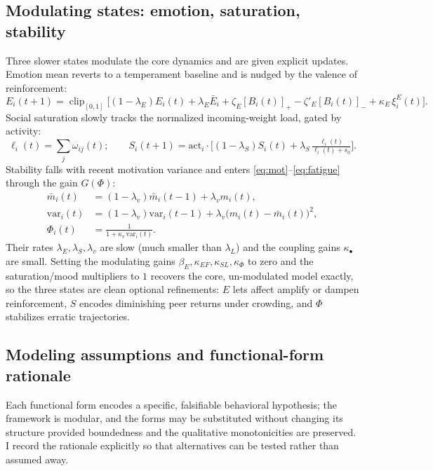 \documentclass[11pt]{article}
\newcommand{\clip}{\operatorname{clip}_{[0,1]}}
\begin{document}
\subsection{Modulating states: emotion, saturation, stability}\label{sec:modulating}
Three slower states modulate the core dynamics and are given explicit updates. Emotion mean reverts to a temperament baseline and is nudged by the valence of reinforcement:
\begin{equation}\tag{E}\label{eq:emotion}
E_i(t{+}1)=\clip\!\Big[(1-\lambda_E)E_i(t)+\lambda_E\bar E_i+\zeta_E[B_i(t)]_+-\zeta'_E[B_i(t)]_-+\kappa_E\,\xi^E_i(t)\Big].
\end{equation}
Social saturation slowly tracks the normalized incoming-weight load, gated by activity:
\begin{equation}\tag{S}\label{eq:saturation}
\ell_i(t)=\sum_j\omega_{ij}(t);\qquad S_i(t{+}1)=\mathrm{act}_i\cdot\Big[(1-\lambda_S)S_i(t)+\lambda_S\,\tfrac{\ell_i(t)}{\ell_i(t)+s_0}\Big].
\end{equation}
Stability falls with recent motivation variance and enters \eqref{eq:mot}--\eqref{eq:fatigue} through the gain $G(\Phi)$:
\begin{equation}\tag{$\Phi$}\label{eq:stability}
\begin{aligned}
\bar m_i(t)&=(1-\lambda_v)\bar m_i(t{-}1)+\lambda_v m_i(t),\\
\mathrm{var}_i(t)&=(1-\lambda_v)\mathrm{var}_i(t{-}1)+\lambda_v\big(m_i(t)-\bar m_i(t)\big)^2,\\
\Phi_i(t)&=\frac{1}{1+\kappa_v\,\mathrm{var}_i(t)}.
\end{aligned}
\end{equation}
Their rates $\lambda_E,\lambda_S,\lambda_v$ are slow (much smaller than $\lambda_L$) and the coupling gains $\kappa_\bullet$ are small. Setting the modulating gains $\beta_E,\kappa_{EF},\kappa_{SL},\kappa_\Phi$ to zero and the saturation/mood multipliers to $1$ recovers the core, un-modulated model exactly, so the three states are clean optional refinements: $E$ lets affect amplify or dampen reinforcement, $S$ encodes diminishing peer returns under crowding, and $\Phi$ stabilizes erratic trajectories.

\subsection{Modeling assumptions and functional-form rationale}\label{sec:assumptions}
Each functional form encodes a specific, falsifiable behavioral hypothesis; the framework is modular, and the forms may be substituted without changing its structure provided boundedness and the qualitative monotonicities are preserved. I record the rationale explicitly so that alternatives can be tested rather than assumed away.
\end{document}
